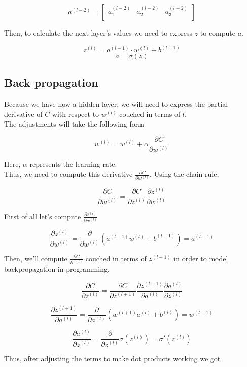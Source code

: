 \documentclass[]{report}
\begin{document}
\[a^{(l-2)}=\begin{bmatrix}
a^{(l-2)}_1 & a^{(l-2)}_2 & a^{(l-2)}_3 \\
\end{bmatrix}\]

{Then, to calculate the next layer's values we need to express $z$ to compute $a$.}

\[z^{(l)}=a^{(l-1)} \cdot w^{(l)}+b^{(l-1)}\]
\[a=\sigma (z)\]

\subsection{Back propagation}

{Because we have now a hidden layer, we will need to express the partial derivative of $C$ with respect to $w^{(l)}$ couched in terms of $l$.}\\
{The adjustments will take the following form}

\[w^{(l)}=w^{(l)}+\alpha \frac{\partial C}{\partial w^{(l)}}\]

{Here, $\alpha$ represents the learning rate.}\\
{Thus, we need to compute this derivative $\frac{\partial C}{\partial w^{(l)}}$.}
{Using the chain rule,}

\[\frac{\partial C}{\partial w^{(l)}}=\frac{\partial C}{\partial z^{(l)}} \frac{\partial z^{(l)}}{\partial w^{(l)}}\]

{First of all let's compute $\frac{\partial z^{(l)}}{\partial w^{(l)}}$}

\[\frac{\partial z^{(l)}}{\partial w^{(l)}} = \frac{\partial}{\partial w^{(l)}} \left( a^{(l-1)} w^{(l)} + b^{(l-1)} \right)=a^{(l-1)}\]

{Then, we'll compute $\frac{\partial C}{\partial z^{(l)}}$ couched in terms of $z^{(l+1)}$ in order to model backpropagation in programming.}

\[\frac{\partial C}{\partial z^{(l)}}=\frac{\partial C}{\partial z^{(l+1)}}\frac{\partial z^{(l+1)}}{\partial a^{(l)}}\frac{\partial a^{(l)}}{\partial z^{(l)}}\]

\[\frac{\partial z^{(l+1)}}{\partial a^{(l)}}=\frac{\partial}{\partial a^{(l)}} \left(w^{(l+1)} a^{(l)} + b^{(l)}\right)=w^{(l+1)}\]

\[\frac{\partial a^{(l)}}{\partial z^{(l)}}=\frac{\partial}{\partial z^{(l)}} \sigma \left(z^{(l)}\right)=\sigma\prime\left(z^{(l)}\right)\]

{Thus, after adjusting the terms to make dot products working we got}
\end{document}
